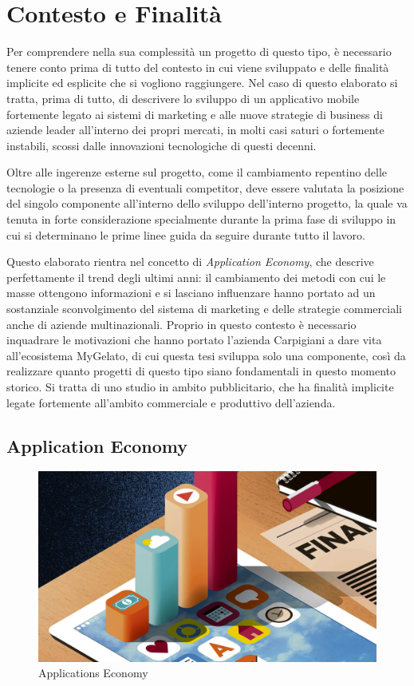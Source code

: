 \section{Contesto e Finalità}
Per comprendere nella sua complessità un progetto di questo tipo, è necessario tenere conto prima di tutto del contesto in cui viene sviluppato e delle finalità implicite ed esplicite che si vogliono raggiungere.
Nel caso di questo elaborato si tratta, prima di tutto, di descrivere lo sviluppo di un applicativo mobile fortemente legato ai sistemi di marketing e alle nuove strategie di business di aziende leader all'interno dei propri mercati, in molti casi saturi o fortemente instabili, scossi dalle innovazioni tecnologiche di questi decenni.

Oltre alle ingerenze esterne sul progetto, come il cambiamento repentino delle tecnologie o la presenza di eventuali competitor, deve essere valutata la posizione del singolo componente all'interno dello sviluppo dell'interno progetto, la quale va tenuta in forte considerazione specialmente durante la prima fase di sviluppo in cui si determinano le prime linee guida da seguire durante tutto il lavoro.

Questo elaborato rientra nel concetto di \textit{Application Economy}, che descrive perfettamente il trend degli ultimi anni: il cambiamento dei metodi con cui le masse ottengono informazioni e si lasciano influenzare hanno portato ad un sostanziale sconvolgimento del sistema di marketing e delle strategie commerciali anche di aziende multinazionali. 
Proprio in questo contesto è necessario inquadrare le motivazioni che hanno portato l'azienda Carpigiani a dare vita all'ecosistema MyGelato, di cui questa tesi sviluppa solo una componente, così da realizzare quanto progetti di questo tipo siano fondamentali in questo momento storico.
Si tratta di uno studio in ambito pubblicitario, che ha finalità implicite legate fortemente all'ambito commerciale e produttivo dell'azienda.


\subsection{Application Economy}
  
\begin{figure}[h!]
  \includegraphics[width=\linewidth]{images/The-App-Economy.jpg}
  \caption{Applications Economy}
  \label{fig:appEconomy1}
\end{figure}
  
